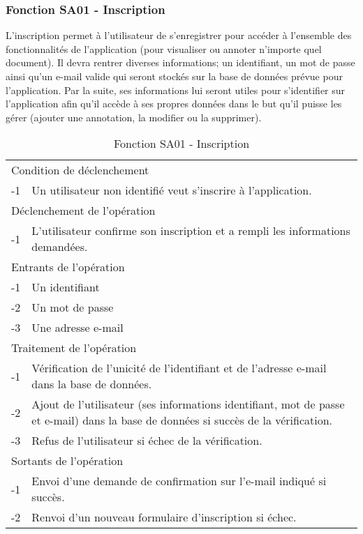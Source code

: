 \documentclass[a4paper]{article}
\begin{document}
\subsubsection{Fonction SA01 - Inscription}

L’inscription permet à l’utilisateur de s’enregistrer pour accéder à l’ensemble des fonctionnalités de l’application (pour visualiser ou annoter n’importe quel document). Il devra rentrer diverses informations; un identifiant, un mot de passe ainsi qu’un e-mail valide qui seront stockés sur la base de données prévue pour l’application. Par la suite, ses informations lui seront utiles pour s’identifier sur l’application afin qu’il accède à ses propres données dans le but qu’il puisse les gérer (ajouter une annotation, la modifier ou la supprimer).
    
\begin{table}[H]
  \centering
   \small
	\begin{tabular}{|c|p{12cm}|}
   		\hline
   			\rowcolor{lightgray}\multicolumn{2}{|c|}{\textbf{Fonction SA01 - Inscription}} \\
   		\hline
   			\multicolumn{2}{|l|}{Condition de déclenchement} \\
   		\hline
   			-1 & Un utilisateur non identifié veut s'inscrire à l'application.\\
   		\hline
   			\multicolumn{2}{|l|}{Déclenchement de l'opération} \\
   		\hline
   			-1 & L'utilisateur confirme son inscription et a rempli les informations demandées.\\
   		\hline
   			\multicolumn{2}{|l|}{Entrants de l'opération} \\
   		\hline
   			-1 & Un identifiant\\
        	-2 & Un mot de passe\\ 
        	-3 & Une adresse e-mail\\ 
   		\hline
   			\multicolumn{2}{|l|}{Traitement de l'opération} \\
  		\hline
   			-1 & Vérification de l'unicité de l'identifiant et de l'adresse e-mail dans la base de données.\\
        	-2 & Ajout de l'utilisateur (ses informations identifiant, mot de passe et e-mail) dans la base de données si succès de la vérification.\\
        	-3 & Refus de l'utilisateur si échec de la vérification.\\
   		\hline
   			\multicolumn{2}{|l|}{Sortants de l'opération} \\
   		\hline
   			-1 & Envoi d'une demande de confirmation sur l'e-mail indiqué si succès.\\
            -2 & Renvoi d'un nouveau formulaire d'inscription si échec.\\
   		\hline
	\end{tabular}
  \caption{Fonction SA01 - Inscription}
  \normalsize
  \label{tab: inscription}
\end{table}
    
\end{document}

